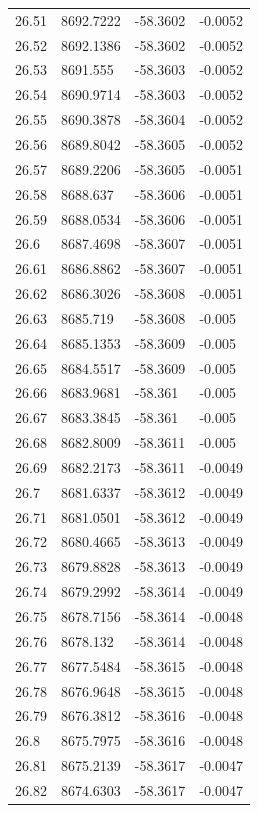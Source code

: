 \begin{table}[H]
\begin{tabular}{llll}
26.51 & 8692.7222 & -58.3602 & -0.0052 \\
26.52 & 8692.1386 & -58.3602 & -0.0052 \\
26.53 & 8691.555 & -58.3603 & -0.0052 \\
26.54 & 8690.9714 & -58.3603 & -0.0052 \\
26.55 & 8690.3878 & -58.3604 & -0.0052 \\
26.56 & 8689.8042 & -58.3605 & -0.0052 \\
26.57 & 8689.2206 & -58.3605 & -0.0051 \\
26.58 & 8688.637 & -58.3606 & -0.0051 \\
26.59 & 8688.0534 & -58.3606 & -0.0051 \\
26.6 & 8687.4698 & -58.3607 & -0.0051 \\
26.61 & 8686.8862 & -58.3607 & -0.0051 \\
26.62 & 8686.3026 & -58.3608 & -0.0051 \\
26.63 & 8685.719 & -58.3608 & -0.005 \\
26.64 & 8685.1353 & -58.3609 & -0.005 \\
26.65 & 8684.5517 & -58.3609 & -0.005 \\
26.66 & 8683.9681 & -58.361 & -0.005 \\
26.67 & 8683.3845 & -58.361 & -0.005 \\
26.68 & 8682.8009 & -58.3611 & -0.005 \\
26.69 & 8682.2173 & -58.3611 & -0.0049 \\
26.7 & 8681.6337 & -58.3612 & -0.0049 \\
26.71 & 8681.0501 & -58.3612 & -0.0049 \\
26.72 & 8680.4665 & -58.3613 & -0.0049 \\
26.73 & 8679.8828 & -58.3613 & -0.0049 \\
26.74 & 8679.2992 & -58.3614 & -0.0049 \\
26.75 & 8678.7156 & -58.3614 & -0.0048 \\
26.76 & 8678.132 & -58.3614 & -0.0048 \\
26.77 & 8677.5484 & -58.3615 & -0.0048 \\
26.78 & 8676.9648 & -58.3615 & -0.0048 \\
26.79 & 8676.3812 & -58.3616 & -0.0048 \\
26.8 & 8675.7975 & -58.3616 & -0.0048 \\
26.81 & 8675.2139 & -58.3617 & -0.0047 \\
26.82 & 8674.6303 & -58.3617 & -0.0047 \\

\end{tabular}
\end{table}
